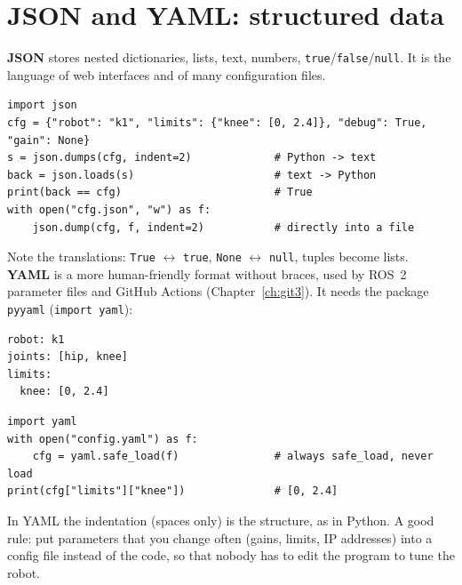 \section*{JSON and YAML: structured data}
\textbf{JSON} stores nested dictionaries, lists, text, numbers, \texttt{true}/\texttt{false}/\texttt{null}. It is the language of web interfaces and of many configuration files.
\begin{verbatim}
import json
cfg = {"robot": "k1", "limits": {"knee": [0, 2.4]}, "debug": True, "gain": None}
s = json.dumps(cfg, indent=2)             # Python -> text
back = json.loads(s)                      # text -> Python
print(back == cfg)                        # True
with open("cfg.json", "w") as f:
    json.dump(cfg, f, indent=2)           # directly into a file
\end{verbatim}
Note the translations: \texttt{True} $\leftrightarrow$ \texttt{true}, \texttt{None} $\leftrightarrow$ \texttt{null}, tuples become lists. \textbf{YAML} is a more human-friendly format without braces, used by ROS~2 parameter files and GitHub Actions (Chapter~\ref{ch:git3}). It needs the package \texttt{pyyaml} (\texttt{import yaml}):
\begin{verbatim}
robot: k1
joints: [hip, knee]
limits:
  knee: [0, 2.4]
\end{verbatim}
\begin{verbatim}
import yaml
with open("config.yaml") as f:
    cfg = yaml.safe_load(f)               # always safe_load, never load
print(cfg["limits"]["knee"])              # [0, 2.4]
\end{verbatim}
In YAML the indentation (spaces only) is the structure, as in Python. A good rule: put parameters that you change often (gains, limits, IP addresses) into a config file instead of the code, so that nobody has to edit the program to tune the robot.

